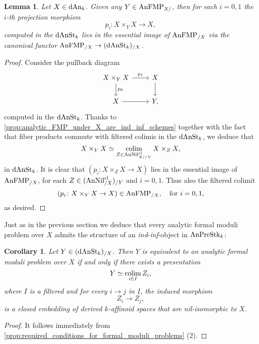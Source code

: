 \documentclass[10pt,a4paper,reqno]{amsart} %
\theoremstyle{plain}
\newtheorem{lem}[thm]{Lemma}
\newtheorem{cor}[thm]{Corollary}
\theoremstyle{definition}
\theoremstyle{remark}
\numberwithin{equation}{section}
\begin{document}
\begin{lem} \label{formal_moduli_under_induce_formal_moduli_over_via_base_change}
    Let $X \in \mathrm{dAn}_k$. Given any $Y \in \mathrm{AnFMP}_{X/ }$, then for each $i= 0, 1$ the $i$-th projection morphism
        \[
            p_i \colon X \times_Y X \to X,  
        \]
    computed in the \infcat $\mathrm{dAnSt}_k$ lies in the essential image of $\mathrm{AnFMP}_{/X}$ via the canonical functor $\mathrm{AnFMP}_{/ X} \to (\mathrm{dAnSt}_k)_{/ X}$.
\end{lem}

\begin{proof}
    Consider the pullback diagram
        \[
        \begin{tikzcd}
            X \times_Y X \ar{r}{p_1} \ar{d}{p_0} & X \ar{d} \\
            X \ar{r} & Y ,
        \end{tikzcd}
        \]
    computed in the \infcat $\mathrm{dAnSt}_k$. Thanks to \cref{prop:analytic_FMP_under_X_are_ind_inf_schemes} together with the fact that fiber products commute with filtered colimis in the \infcat $\mathrm{dAnSt}_k$,
    we deduce that
        \[
            X \times_Y X \simeq \operatorname*{colim}_{Z \in \mathrm{AnNil}^{\mathrm{cl}}_{X//Y}} X \times_Z X, 
        \]
    in $\mathrm{dAnSt}_k$. It is clear that $(p_i \colon X \times_Z X \to X)$ lies in the essential image of $ \mathrm{AnFMP}_{/X}$, for each $Z \in (\mathrm{AnNil}_{/ X} ^{\mathrm{cl}})_{/ Y}$ and $i = 0, 1$.
    Thus also the filtered colimit
        \[
            (p_i \colon X \times_Y X \to X) \in \mathrm{AnFMP}_{/X}, \quad \mathrm{for \ } i = 0, 1,
        \]  
    as desired.
\end{proof}


Just as in the previous section we deduce that every analytic formal moduli problem over $X$ admits the structure of an \emph{ind}-\emph{inf}-object
in $\mathrm{AnPreStk}_k$:

\begin{cor} \label{cor:formal_moduli_problems_over_X_are_ind_inf_objects}
    Let $Y \in (\mathrm{dAnSt}_k)_{/X}$. Then $Y$ is equivalent to an analytic formal moduli problem over $X$ if and only if there exists
    a presentation 
        \[Y \simeq \operatorname*{colim}_{i \in I} Z_i,\]
    where $I$ is a filtered \infcat and for every $i \to j$ in $I$, the induced morphism
        \[
          Z_i \to Z_j,  
        \]
    is a closed embedding of derived $k$-affinoid spaces that are nil-isomorphic to $X$.
\end{cor}

\begin{proof}
    It follows immediately from \cref{prop:required_conditions_for_formal_moduli_problems} (2).
\end{proof}
\end{document}
